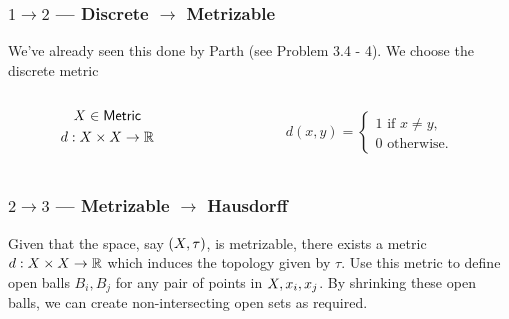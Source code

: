 \begin{frame}
    \frametitle{\(1 \rightarrow 2\) --- Discrete \(\rightarrow\) Metrizable}


    We've already seen this done by Parth (see Problem 3.4 - 4). We choose the
    discrete metric 

    \begin{columns}
        \begin{column}{0.5\textwidth}
            \begin{gather*}
                X \in \textsf{Metric}\\
                d : X \times X \to \mathbb{R} 
            \end{gather*}
        \end{column}
        \begin{column}{0.5\textwidth}
            \begin{gather*}
                d(x, y) = \begin{cases}
                    1 \text{ if } x \not = y,\\
                    0 \text{ otherwise.}
                \end{cases}
            \end{gather*}
        \end{column}
    \end{columns}

    \pause

    \begin{figure}
        \scalebox{1}{}
    \end{figure}

\end{frame}

\begin{frame}
    \frametitle{\(2 \rightarrow 3\) --- Metrizable \(\rightarrow\) Hausdorff}

    Given that the space, say \((X, \tau)\), is metrizable, there exists a
    metric \(d: X \times X \to \mathbb{R}\) which induces the topology given
    by \(\tau\). \pause
    Use this metric to define open balls \(B_i, B_j\) for any pair of points in
    \(X, x_i, x_j\). \pause By shrinking these open balls, we can create
    non-intersecting open sets as required.
    \pause
    \begin{figure}
        \scalebox{1}{}
    \end{figure}

\end{frame}

